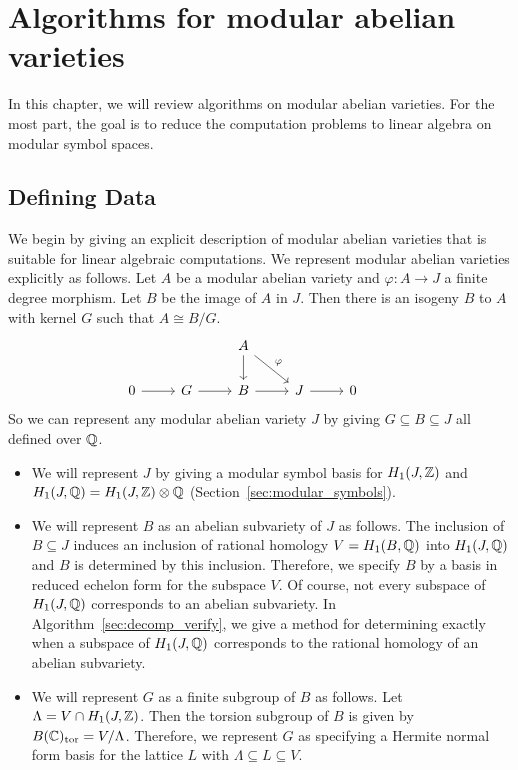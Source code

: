 \chapter{Algorithms for modular abelian varieties}%
\label{chap:algorithms}

In this chapter, we will review algorithms on modular abelian varieties. For
the most part, the goal is to reduce the computation problems to linear algebra
on modular symbol spaces.

\section{Defining Data}%
\label{sec:defining_data}

We begin by giving an explicit description of modular abelian varieties that is
suitable for linear algebraic computations. We represent modular abelian
varieties explicitly as follows. Let $A$ be a modular abelian variety and
$\varphi:A\to J$ a finite degree morphism. Let $B$ be the image of $A$ in $J$.
Then there is an isogeny $B$ to $A$ with kernel $G$ such that $A\cong B/G$.
\begin{equation}
    \label{eq:defining_data}
    \begin{tikzcd}
        &
        &
        A \arrow[d]\arrow[dr,"\varphi"] &
        &
        &
        \\
        0 \arrow[r] &
        G \arrow[r] &
        B \arrow[r] &
        J \arrow[r] &
        0
    \end{tikzcd}
\end{equation}
So we can represent any modular abelian variety $J$ by giving $G\subseteq
B\subseteq J$ all defined over $\mathbb{Q}$.

\begin{itemize}
    \item
        We will represent $J$ by giving a modular
        symbol basis for $H_1(J, \mathbb{Z})$ and $H_1(J, \mathbb{Q}) = H_1(J, \mathbb{Z})\otimes
        \mathbb{Q}$ (Section~\ref{sec:modular_symbols}).
    \item
        We will represent $B$ as an abelian subvariety of $J$ as follows. The
        inclusion of $B\subseteq J$ induces an inclusion of rational homology
        $V=H_1(B, \mathbb{Q})$ into $H_1(J, \mathbb{Q})$ and $B$ is determined by this
        inclusion. Therefore, we specify $B$ by a basis in reduced echelon form
        for the subspace $V$. Of course, not every subspace of $H_1(J, \mathbb{Q})$
        corresponds to an abelian subvariety. In
        Algorithm~\ref{sec:decomp_verify}, we give a method for determining
        exactly when a subspace of $H_1(J, \mathbb{Q})$ corresponds to the rational
        homology of an abelian subvariety.
    \item
        We will represent $G$ as a finite subgroup of $B$ as follows. Let
        $\Lambda=V\cap H_1(J, \mathbb{Z})$. Then the torsion subgroup of $B$ is given
        by $B(\mathbb{C})_{\mathrm{tor}}=V/\Lambda$. Therefore, we represent $G$ as specifying a
        Hermite normal form basis for the lattice $L$ with $\Lambda \subseteq L
        \subseteq V$.
\end{itemize}

